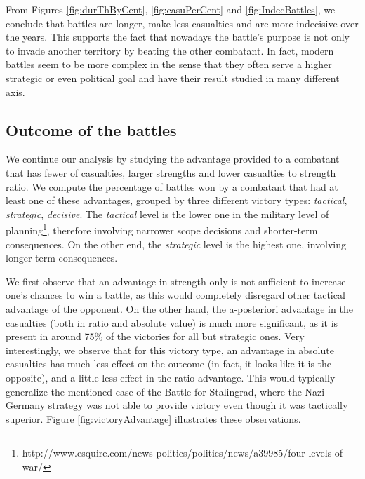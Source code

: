 From Figures \ref{fig:durThByCent}, \ref{fig:casuPerCent} and \ref{fig:IndecBattles}, we conclude that battles are longer, make less casualties and are more indecisive over the years. This supports the fact that nowadays the battle's purpose is not only to invade another territory by beating the other combatant. In fact, modern battles seem to be more complex in the sense that they often serve a higher strategic or even political goal and have their result studied in many different axis.

\subsection{Outcome of the battles}

We continue our analysis by studying the advantage provided to a combatant that has fewer of casualties, larger strengths  and  lower casualties to strength ratio. We compute the percentage of battles won by a combatant that had at least one of these advantages, grouped by three different victory types: \textit{tactical}, \textit{strategic},  \textit{decisive}. The \textit{tactical} level is the lower one in the military level of planning\footnote{http://www.esquire.com/news-politics/politics/news/a39985/four-levels-of-war/}, therefore involving narrower scope decisions and shorter-term consequences. On the other end, the \textit{strategic} level is the highest one, involving longer-term
consequences.

We first observe that an advantage in strength only is not sufficient to increase one's chances to win a battle, as this would completely disregard other tactical advantage of the opponent. On the other hand, the a-posteriori advantage in the casualties (both in ratio and absolute value) is much more significant, as it is present in around 75\% of the victories for all but strategic ones. Very interestingly, we observe that for this victory type, an advantage in absolute casualties has much less effect on the outcome (in fact, it looks like it is the opposite), and a little less effect in the ratio advantage. This would typically generalize the mentioned case of the Battle for Stalingrad, where the Nazi Germany strategy was not able to provide victory even though it was tactically superior. Figure \ref{fig:victoryAdvantage} illustrates these observations.

